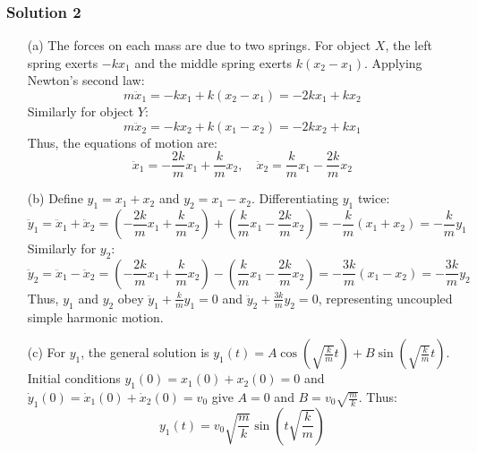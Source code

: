 \documentclass{article}
\begin{document}
\subsubsection{Solution 2}
\begin{enumerate}
    \item[(a)] The forces on each mass are due to two springs. For object $X$, the left spring exerts $-kx_1$ and the middle spring exerts $k(x_2 - x_1)$. Applying Newton's second law:
    \[
    m \ddot{x}_1 = -kx_1 + k(x_2 - x_1) = -2kx_1 + kx_2
    \]
    Similarly for object $Y$:
    \[
    m \ddot{x}_2 = -kx_2 + k(x_1 - x_2) = -2kx_2 + kx_1
    \]
    Thus, the equations of motion are:
    \[
    \ddot{x}_1 = -\frac{2k}{m}x_1 + \frac{k}{m}x_2, \quad \ddot{x}_2 = \frac{k}{m}x_1 - \frac{2k}{m}x_2
    \]

    \item[(b)] Define $y_1 = x_1 + x_2$ and $y_2 = x_1 - x_2$. Differentiating $y_1$ twice:
    \[
    \ddot{y}_1 = \ddot{x}_1 + \ddot{x}_2 = \left(-\frac{2k}{m}x_1 + \frac{k}{m}x_2\right) + \left(\frac{k}{m}x_1 - \frac{2k}{m}x_2\right) = -\frac{k}{m}(x_1 + x_2) = -\frac{k}{m}y_1
    \]
    Similarly for $y_2$:
    \[
    \ddot{y}_2 = \ddot{x}_1 - \ddot{x}_2 = \left(-\frac{2k}{m}x_1 + \frac{k}{m}x_2\right) - \left(\frac{k}{m}x_1 - \frac{2k}{m}x_2\right) = -\frac{3k}{m}(x_1 - x_2) = -\frac{3k}{m}y_2
    \]
    Thus, $y_1$ and $y_2$ obey $\ddot{y}_1 + \frac{k}{m}y_1 = 0$ and $\ddot{y}_2 + \frac{3k}{m}y_2 = 0$, representing uncoupled simple harmonic motion.

    \item[(c)] For $y_1$, the general solution is $y_1(t) = A\cos\left(\sqrt{\frac{k}{m}}t\right) + B\sin\left(\sqrt{\frac{k}{m}}t\right)$. Initial conditions $y_1(0) = x_1(0) + x_2(0) = 0$ and $\dot{y}_1(0) = \dot{x}_1(0) + \dot{x}_2(0) = v_0$ give $A = 0$ and $B = v_0\sqrt{\frac{m}{k}}$. Thus:
    \[
    y_1(t) = v_0\sqrt{\frac{m}{k}}\sin\left(t\sqrt{\frac{k}{m}}\right)
    \]
\end{enumerate}
\end{document}
